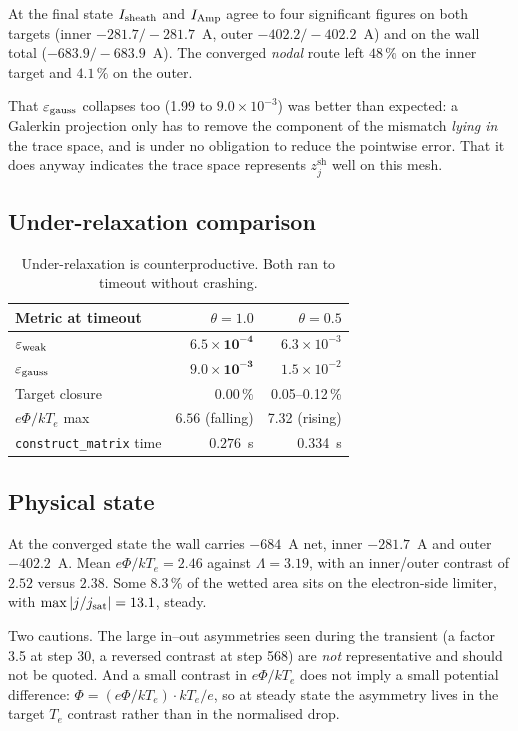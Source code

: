 \documentclass[11pt,a4paper]{article}
\newcommand{\zjsh}{z^{\mathrm{sh}}_{j}}
\newcommand{\code}[1]{\texttt{\small #1}}
\begin{document}
At the final state $I_{\rm sheath}$ and $I_{\rm Amp}$ agree to four significant figures on both targets
(inner $-281.7/-281.7$~A, outer $-402.2/-402.2$~A) and on the wall total ($-683.9/-683.9$~A). The
converged \emph{nodal} route left $48\,\%$ on the inner target and $4.1\,\%$ on the outer.

That $\varepsilon_{\rm gauss}$ collapses too (1.99 to $9.0\times10^{-3}$) was better than expected: a
Galerkin projection only has to remove the component of the mismatch \emph{lying in} the trace space,
and is under no obligation to reduce the pointwise error. That it does anyway indicates the trace
space represents $\zjsh$ well on this mesh.

\subsection{Under-relaxation comparison}

\begin{table}[h]\centering\small
\begin{tabular}{@{}lrr@{}}
\toprule
Metric at timeout & $\theta = 1.0$ & $\theta = 0.5$ \\
\midrule
$\varepsilon_{\rm weak}$ & $\bm{6.5\times10^{-4}}$ & $6.3\times10^{-3}$ \\
$\varepsilon_{\rm gauss}$ & $\bm{9.0\times10^{-3}}$ & $1.5\times10^{-2}$ \\
Target closure & $\bm{0.00\,\%}$ & 0.05--0.12\,\% \\
$e\Phi/kT_e$ max & $\bm{6.56}$ (falling) & 7.32 (rising) \\
\code{construct\_matrix} time & $\bm{0.276}$~s & 0.334~s \\
\bottomrule
\end{tabular}
\caption{Under-relaxation is counterproductive. Both ran to timeout without crashing.}
\label{tab:relax}
\end{table}

\subsection{Physical state}

At the converged state the wall carries $-684$~A net, inner $-281.7$~A and outer $-402.2$~A. Mean
$e\Phi/kT_e = 2.46$ against $\Lambda=3.19$, with an inner/outer contrast of $2.52$ versus $2.38$. Some
$8.3\,\%$ of the wetted area sits on the electron-side limiter, with $\max|j/j_{\rm sat}|=13.1$,
steady.

Two cautions. The large in--out asymmetries seen during the transient (a factor 3.5 at step 30, a
reversed contrast at step 568) are \emph{not} representative and should not be quoted. And a small
contrast in $e\Phi/kT_e$ does not imply a small potential difference: $\Phi = (e\Phi/kT_e)\cdot kT_e/e$,
so at steady state the asymmetry lives in the target $T_e$ contrast rather than in the normalised drop.
\end{document}
